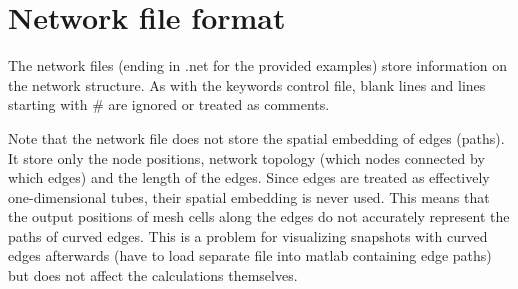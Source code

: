 \documentclass[12pt]{article}
\begin{document}
\section{Network file format}
The network files (ending in .net for the provided examples) store information on the network structure. 
As with the keywords control file, blank lines and lines starting with \# are ignored or treated as comments.

Note that the network file does not store the spatial embedding of edges (paths). It store only the node positions, network topology (which nodes connected by which edges) and the length of the edges. Since edges are treated as effectively one-dimensional tubes, their spatial embedding is never used. This means that the output positions of mesh cells along the edges do not accurately represent the paths of curved edges. This is a problem for visualizing snapshots with curved edges afterwards (have to load separate file into matlab containing edge paths) but does not affect the calculations themselves.
\end{document}
